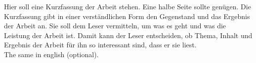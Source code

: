 \kurzfassung
Hier soll eine Kurzfassung der Arbeit stehen. Eine halbe Seite sollte genügen. Die Kurzfassung gibt in einer verständlichen Form den Gegenstand und das Ergebnis der Arbeit an. Sie soll dem Leser vermitteln, um was es geht und was die Leistung der Arbeit ist. Damit kann der Leser entscheiden, ob Thema, Inhalt und Ergebnis der Arbeit für ihn so interessant sind, dass er sie liest.
\\[3ex]
\noindent
The same in english (optional).


